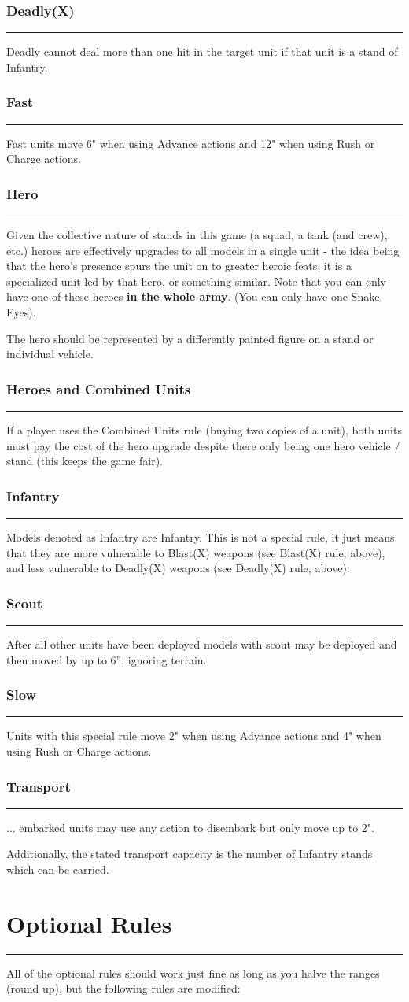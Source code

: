 \documentclass[11pt]{article}
\newcommand{\mysection}[1]{
  \section*{\centering #1}
  \raggedright
  \hrule
  \bigskip

}
\newcommand{\myheading}[1]{
  \subsubsection*{\centering #1}
  \raggedright
  \hrule
}
\begin{document}
\begin{multicols*}{3}[]
\myheading{Deadly(X)}

Deadly cannot deal more than one hit in the target unit if that unit is a stand
of Infantry.

\myheading{Fast}

Fast units move 6" when using Advance actions and 12" when using Rush or Charge
actions.

\myheading{Hero}

Given the collective nature of stands in this game (a squad, a tank (and crew),
etc.) heroes are effectively upgrades to all models in a single unit - the idea
being that the hero's presence spurs the unit on to greater heroic feats, it is
a specialized unit led by that hero, or something similar. Note that you can
only have one of these heroes {\bf in the whole army}. (You can only have one
Snake Eyes).

The hero should be represented by a differently painted figure on a stand or
individual vehicle.

\myheading{Heroes and Combined Units}

If a player uses the Combined Units rule (buying two copies of a unit), both
units must pay the cost of the hero upgrade despite there only being one hero
vehicle / stand (this keeps the game fair).

\myheading{Infantry}

Models denoted as Infantry are Infantry. This is not a special rule, it just
means that they are more vulnerable to Blast(X) weapons (see Blast(X) rule,
above), and less vulnerable to Deadly(X) weapons (see Deadly(X) rule, above).

\myheading{Scout}

After all other units have been deployed models with scout may be deployed and
then moved by up to 6”, ignoring terrain.

\myheading{Slow}

Units with this special rule move 2" when using Advance actions and 4" when
using Rush or Charge actions.

\myheading{Transport}

... embarked units may use any action to disembark but only move up to 2".

Additionally, the stated transport capacity is the number of Infantry stands which can be carried.

\newpage

\mysection{Optional Rules}

All of the optional rules should work just fine as long as you halve the ranges
(round up), but the following rules are modified:


\end{multicols*}
\end{document}
